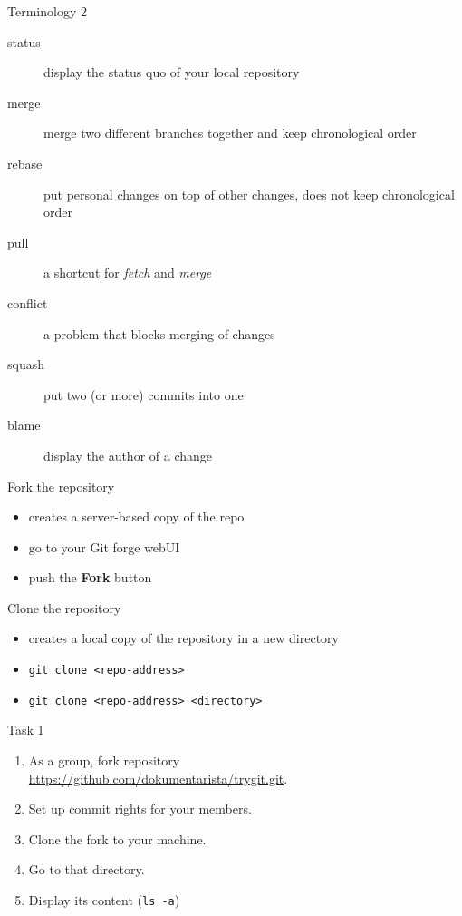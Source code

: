 \documentclass[14pt]{beamer}
\begin{document}
	\begin{frame}{Terminology 2}
	\begin{description}
		\item[status] display the status quo of your local repository
		\item[merge] merge two different branches together and keep chronological order
		\item[rebase] put personal changes on top of other changes, does not keep chronological order
		\item[pull] a shortcut for \textit{fetch} and \textit{merge}
		\item[conflict] a problem that blocks merging of changes
		\item[squash] put two (or more) commits into one
		\item[blame] display the author of a change
	\end{description}
	\end{frame}

	\begin{frame}{Fork the repository}
	\begin{itemize}
		\item creates a server-based copy of the repo
		\item go to your Git forge webUI
		\item push the \textbf{Fork} button
	\end{itemize}
	\end{frame}


	\begin{frame}{Clone the repository}
	\begin{itemize}
		\item creates a local copy of the repository in a new directory
		\item \texttt{git clone <repo-address>}
		\item \texttt{git clone <repo-address> <directory>}
	\end{itemize}

	\end{frame}

	\begin{frame}{Task 1}
	\begin{enumerate}
		\item As a group, fork repository \\ {\small \url{https://github.com/dokumentarista/trygit.git}}.
		\item Set up commit rights for your members.
		\item Clone the fork to your machine.
		\item Go to that directory.
		\item Display its content (\texttt{ls -a})
	\end{enumerate}
	
	\end{frame}
\end{document}
